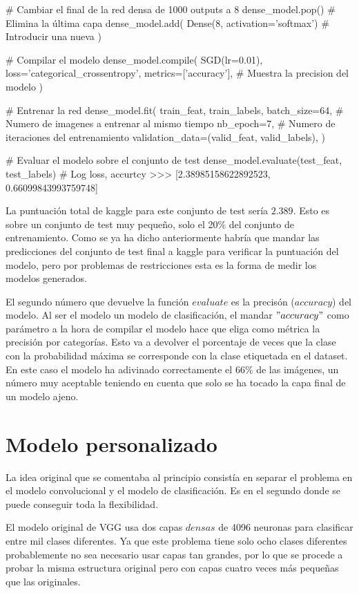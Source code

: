 \begin{python}

# Cambiar el final de la red densa de 1000 outputs a 8
dense_model.pop()  # Elimina la última capa
dense_model.add(
    Dense(8, activation='softmax')  # Introducir una nueva
)

# Compilar el modelo
dense_model.compile(
    SGD(lr=0.01),
    loss='categorical_crossentropy',
    metrics=['accuracy'],  # Muestra la precision del modelo
)

# Entrenar la red
dense_model.fit(
    train_feat,
    train_labels,
    batch_size=64,  # Numero de imagenes a entrenar al mismo tiempo
    nb_epoch=7,     # Numero de iteraciones del entrenamiento
    validation_data=(valid_feat, valid_labels),
)

# Evaluar el modelo sobre el conjunto de test
dense_model.evaluate(test_feat, test_labels)
# Log loss, accurtcy
>>> [2.38985158622892523, 0.66099843993759748]
\end{python}

La puntuación total de kaggle para este conjunto de test sería $2.389$. Esto es sobre un conjunto de test muy pequeño, solo el 20\% del conjunto de entrenamiento. Como se ya ha dicho anteriormente habría que mandar las predicciones del conjunto de test final a kaggle para verificar la puntuación del modelo, pero por problemas de restricciones esta es la forma de medir los modelos generados.

El segundo número que devuelve la función $evaluate$ es la precisón ($accuracy$) del modelo. Al ser el modelo un modelo de clasificación, el mandar $"accuracy"$ como parámetro a la hora de compilar el modelo hace que eliga como métrica la precisión por categorías. Esto va a devolver el porcentaje de veces que la clase con la probabilidad máxima se corresponde con la clase etiquetada en el dataset. En este caso el modelo ha adivinado correctamente el 66\% de las imágenes, un número muy aceptable teniendo en cuenta que solo se ha tocado la capa final de un modelo ajeno.

\section{Modelo personalizado}

La idea original que se comentaba al principio consistía en separar el problema en el modelo convolucional y el modelo de clasificación. Es en el segundo donde se puede conseguir toda la flexibilidad. 

El modelo original de VGG usa dos capas $densas$ de 4096 neuronas para clasificar entre mil clases diferentes. Ya que este problema tiene solo ocho clases diferentes probablemente no sea necesario usar capas tan grandes, por lo que se procede a probar la misma estructura original pero con capas cuatro veces más pequeñas que las originales.

